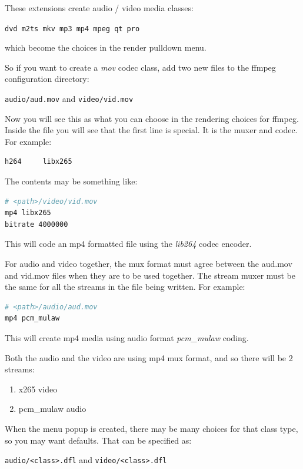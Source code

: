 These extensions create audio / video media classes:

\texttt{dvd \quad  m2ts \quad  mkv \quad  mp3 \quad  mp4 \quad  mpeg  \quad qt \quad  pro}

which become the choices in the render pulldown menu.

So if you want to create a \textit{mov} codec class, add two new files to the ffmpeg configuration directory:

\texttt{audio/aud.mov}  and  \texttt{video/vid.mov}

Now you will see this as what you can choose in the rendering choices for ffmpeg.
Inside the file you will see that the first line is special.  It is the muxer and codec.  For example:

\begin{lstlisting}[language=bash,numbers=none]
h264     libx265
\end{lstlisting}

The contents may be something like:

\begin{lstlisting}[language=bash,numbers=none]
# <path>/video/vid.mov 
mp4 libx265
bitrate 4000000
\end{lstlisting}

This will code an mp4 formatted file using the \textit{lib264} codec encoder.

For audio and video together, the mux format must agree between the aud.mov and vid.mov files when they are to be used together.  The stream muxer must be the same for all the streams in the file being written.
For example:

\begin{lstlisting}[language=bash,numbers=none]
# <path>/audio/aud.mov
mp4 pcm_mulaw
\end{lstlisting}

This will create mp4 media using audio format \textit{pcm\_mulaw} coding.

Both the audio and the video are using mp4 mux format, and so there will be 2 streams:
\begin{enumerate}
    \item x265 video
    \item pcm\_mulaw audio
\end{enumerate}

When the menu popup is created, there may be many choices for that class type, so you may want defaults.  That can be specified as:

\texttt{audio/<class>.dfl}  and  \texttt{video/<class>.dfl}

